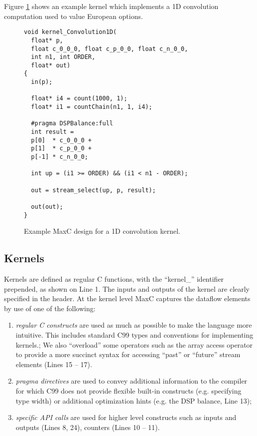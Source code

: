 Figure \ref{fig:maxc-1dconv} shows an example kernel which implements
a 1D convolution computation used to value European options.


\lstset{style=MaxC}

\begin{figure}
\begin{lstlisting}
void kernel_Convolution1D(
  float* p,
  float c_0_0_0, float c_p_0_0, float c_n_0_0,
  int n1, int ORDER,
  float* out)
{
  in(p);

  float* i4 = count(1000, 1);
  float* i1 = countChain(n1, 1, i4);

  #pragma DSPBalance:full
  int result =
  p[0]  * c_0_0_0 +
  p[1]  * c_p_0_0 +
  p[-1] * c_n_0_0;

  int up = (i1 >= ORDER) && (i1 < n1 - ORDER);

  out = stream_select(up, p, result);

  out(out);
}
\end{lstlisting}
\caption{Example MaxC design for a 1D convolution kernel.}
\label{fig:maxc-1dconv}
\end{figure}

\subsection{Kernels}

Kernels are defined as regular C functions, with the ``kernel\_''
identifier prepended, as shown on Line 1. The inputs and outputs of
the kernel are clearly specified in the header. At the kernel level
MaxC captures the dataflow elements by use of one of the following:
\begin{enumerate}

\item \emph{regular C constructs} are used as much as possible to make
  the language more intuitive. This includes standard C99 types and
  conventions for implementing kernels.; We also
  ``overload'' some operators such as the array access operator to
  provide a more succinct syntax for accessing ``past'' or ``future''
  stream elements (Lines 15 -- 17).

\item \emph{pragma directives} are used to convey additional
  information to the compiler for which C99 does not provide flexible
  built-in constructs (e.g. specifying type width) or additional
  optimization hints (e.g. the DSP balance, Line 13);

\item \emph{specific API calls} are used for higher level constructs
  such as inputs and outputs (Lines 8, 24), counters (Lines 10 -- 11).

\end{enumerate}

